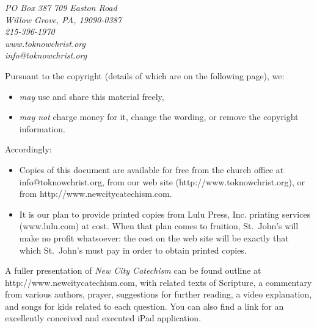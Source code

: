 \documentclass[]{memoir}
\begin{document}
\vspace{-1em}

\begin{center}
\emph{PO Box 387\,\textbullet\,709 Easton Road\\
Willow Grove, PA, 19090-0387\\
215-396-1970\\
www.toknowchrist.org\\
info@toknowchrist.org}
\end{center}

Pursuant to the copyright (details of which are on the following page), we:

\begin{itemize}
	\item {\em may}\/ use and share this material freely,
	\item {\em may not}\/ charge money for it, change the wording, or remove the copyright information.
\end{itemize}

Accordingly:

\begin{itemize}
	\item Copies of this document are available for free from the church office at info@to\hspace{0em}know\hspace{0em}christ.\hspace{0em}org, from our web site (http:\slash{}\slash{}www.to\hspace{0em}know\hspace{0em}christ.org), or from http:\slash{}\slash{}www.new\hspace{0em}city\hspace{0em}cate\hspace{0em}chism.\hspace{0em}com.
	\item It is our plan to provide printed copies from Lulu Press, Inc. printing services (www.lulu.com) at cost. When that plan comes to fruition, St.\ John's will make no profit whatsoever: the cost on the web site will be exactly that which St.\ John's must pay in order to obtain printed copies.
\end{itemize}

A fuller presentation of {\em New City Catechism}\/ can be found outline at http:\slash{}\slash{}www.new\hspace{0em}city\hspace{0em}cat\hspace{0em}echism.\hspace{0em}com, with related texts of Scripture, a commentary from various authors, prayer, suggestions for further reading, a video explanation, and songs for kids related to each question. You can also find a link for an excellently conceived and executed iPad application.
\end{document}
